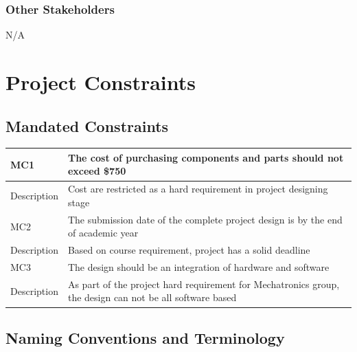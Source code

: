 \documentclass[12pt]{article}
\begin{document}
\subsubsection{Other Stakeholders}
N/A
\section{Project Constraints}
\subsection{Mandated Constraints}
\begin{center}
    \begin{tabular}{|| p{3cm} || p{8cm} ||}
    \hline
    MC1 & The cost of purchasing components and parts should not exceed \$750  \\
    \hline
    Description & Cost are restricted as a hard requirement in project designing stage \\
    \hline\hline
    MC2  & The submission date of the complete project design is by the end of academic year\\
    \hline
    Description & Based on course requirement, project has a solid deadline\\
    \hline\hline
    MC3 & The design should be an integration of hardware and software\\
    \hline
    Description & As part of the project hard requirement for Mechatronics group, the design can not be all software based \\
    \hline\hline
    \end{tabular}
\end{center}
\subsection{Naming Conventions and Terminology}
\end{document}
